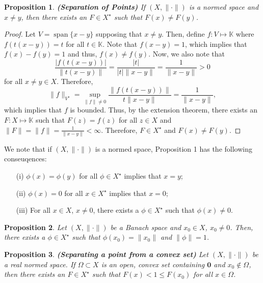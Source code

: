 \documentclass[12pt]{article}
\newtheorem{proposition}{Proposition}
\def\K{\mathbb{K}}
\newcommand{\Om}{\Omega}
\newcommand{\sbs}{\subset}
\newcommand{\Xs}{X^{\star}}
\newcommand{\Vs}{V^{\star}}
\DeclareMathOperator*{\spa}{span}
\newcommand{\ns}{(X, \| \cdot \|)}
\begin{document}
\begin{proposition}\textbf{(Separation of Points)} If $(X, \| \cdot \|)$ is a normed space and $x \neq y$, then there exists an $F \in \Xs$ such that $F(x) \neq F(y)$.
\end{proposition}
\vspace{-25pt}
\begin{proof}
Let $V = \spa\{ x - y\}$ supposing that $x \neq y$. Then, define $f: V \mapsto \K$ where $f(t(x-y)) = t$ for all $t \in \K$. Note that $f(x-y) = 1$, which implies that $f(x) - f(y) = 1$ and thus, $f(x) \neq f(y)$. Now, we also note that 
\[\frac{|f(t(x-y))|}{\| t(x-y)\|} = \frac{|t|}{|t| \| x - y \|} = \frac{1}{\| x - y\|} > 0 \]
for all $x \neq y \in X$. Therefore, 
\[ \| f \|_{\Vs} = \sup\limits_{\| f \| \neq 0} \frac{\| f(t(x-y))\|}{t \| x - y\|} = \frac{1}{\| x- y\|},\]
which implies that $f$ is bounded. Thus, by the extension theorem, there exists an $F: X \mapsto \K$ such that $F(z) = f(z)$ for all $z \in X$ and $\| F\| = \| f \| = \frac{1}{\| x - y\|} < \infty$. Therefore, $F \in \Xs$ and $F(x) \neq F(y)$. 
\end{proof}
\vspace{-25pt}
We note that if $(X, \| \cdot \|)$ is a normed space, Proposition 1 has the following conseuqences:
\begin{enumerate}[topsep=-15pt, itemsep=0pt]
\item[(i)] $\phi(x) = \phi(y)$ for all $\phi \in \Xs$ implies that $x = y$;
\item[(ii)] $\phi(x) = 0$ for all $x \in \Xs$ implies that $x = 0$;
\item[(iii)] For all $x \in X$, $x \neq 0$, there exists a $\phi \in \Xs$ such that $\phi(x) \neq 0$.
\end{enumerate}
\begin{proposition}
Let $\ns$ be a Banach space and $x_0 \in X$, $x_0 \neq 0$. Then, there exists a $\phi \in \Xs$ such that $\phi(x_0) = \| x_0 \|$ and $\| \phi \| = 1$. 
\end{proposition}
\begin{proposition} \textbf{(Separating a point from a convex set)} Let $\ns$ be a real normed space. If $\Om \sbs X$ is an open, convex set containing $\mathbf{0}$ and $x_0 \not\in \Om$, then there exists an $F \in \Xs$ such that $F(x) < 1 \leq F(x_0)$ for all $x \in \Om$.
\end{proposition}
\vspace{-25pt}
\end{document}

